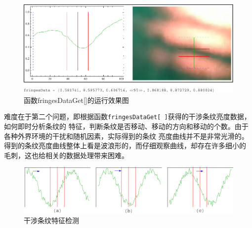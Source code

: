 \documentclass[UTF8,a4paper,12pt]{article}
\begin{document}
\begin{figure}[htbp]
\centering
\includegraphics[width=150mm]{image/fringes-count.pdf}
\caption{函数fringesDataGet[\;]的运行效果图}\label{fig:fringes-count}
\end{figure}

难度在于第二个问题，即根据函数\verb|fringesDataGet[ ]|获得的干涉条纹亮度数据，如何即时分析条纹的
特征，判断条纹是否移动、移动的方向和移动的个数。由于各种外界环境的干扰和随机因素，实际得到的条纹
亮度曲线并不是非常光滑的。得到的条纹亮度曲线整体上看是波浪形的，而仔细观察曲线，却存在许多细小的
毛刺，这也给相关的数据处理带来困难。

\begin{figure}[htbp]
\centering
\includegraphics[width=150mm]{image/line-fringes-2.pdf}
\caption{干涉条纹特征检测}\label{fig:line-fringes-2}
\end{figure}
\end{document}

